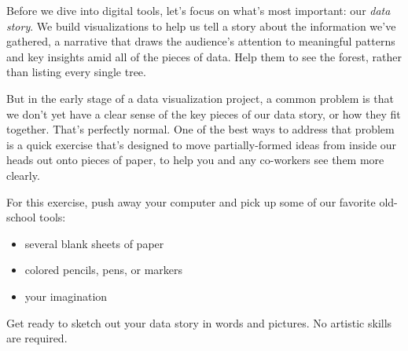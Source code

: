 \documentclass[
  english,
]{book}
\providecommand{\tightlist}{%
  \setlength{\itemsep}{0pt}\setlength{\parskip}{0pt}}
\begin{document}
Before we dive into digital tools, let's focus on what's most important: our \emph{data story}. We build visualizations to help us tell a story about the information we've gathered, a narrative that draws the audience's attention to meaningful patterns and key insights amid all of the pieces of data. Help them to see the forest, rather than listing every single tree.

But in the early stage of a data visualization project, a common problem is that we don't yet have a clear sense of the key pieces of our data story, or how they fit together. That's perfectly normal. One of the best ways to address that problem is a quick exercise that's designed to move partially-formed ideas from inside our heads out onto pieces of paper, to help you and any co-workers see them more clearly.

For this exercise, push away your computer and pick up some of our favorite old-school tools:

\begin{itemize}
\tightlist
\item
  several blank sheets of paper
\item
  colored pencils, pens, or markers
\item
  your imagination
\end{itemize}

Get ready to sketch out your data story in words and pictures. No artistic skills are required.
\end{document}
